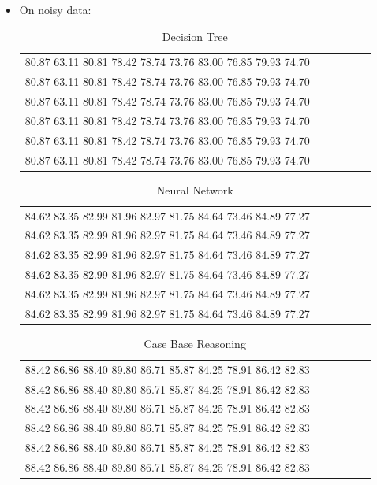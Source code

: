 \documentclass[a4paper,12pt,oneside,final]{report}
\begin{document}
\begin{enumerate}
\begin{itemize}
\item On noisy data:

\begin{table} [H]
\begin{center}
\begin{tabular}{llllll}
80.87 63.11 80.81 78.42 78.74 73.76 83.00 76.85 79.93 74.70 \\
80.87 63.11 80.81 78.42 78.74 73.76 83.00 76.85 79.93 74.70 \\
80.87 63.11 80.81 78.42 78.74 73.76 83.00 76.85 79.93 74.70 \\
80.87 63.11 80.81 78.42 78.74 73.76 83.00 76.85 79.93 74.70 \\
80.87 63.11 80.81 78.42 78.74 73.76 83.00 76.85 79.93 74.70 \\
80.87 63.11 80.81 78.42 78.74 73.76 83.00 76.85 79.93 74.70 \\
\end{tabular}
\caption{ Decision Tree  }
\end{center}
\end{table}


\begin{table} [H]
\begin{center}
\begin{tabular}{llllll}
84.62 83.35 82.99 81.96 82.97 81.75 84.64 73.46 84.89 77.27 \\
84.62 83.35 82.99 81.96 82.97 81.75 84.64 73.46 84.89 77.27 \\
84.62 83.35 82.99 81.96 82.97 81.75 84.64 73.46 84.89 77.27 \\
84.62 83.35 82.99 81.96 82.97 81.75 84.64 73.46 84.89 77.27 \\
84.62 83.35 82.99 81.96 82.97 81.75 84.64 73.46 84.89 77.27 \\
84.62 83.35 82.99 81.96 82.97 81.75 84.64 73.46 84.89 77.27 \\
\end{tabular}
\caption{ Neural Network}
\end{center}
\end{table}

\begin{table} [H]
\begin{center}
\begin{tabular}{llllll}
88.42  86.86  88.40  89.80  86.71  85.87  84.25  78.91  86.42  82.83 \\
88.42  86.86  88.40  89.80  86.71  85.87  84.25  78.91  86.42  82.83 \\
88.42  86.86  88.40  89.80  86.71  85.87  84.25  78.91  86.42  82.83 \\
88.42  86.86  88.40  89.80  86.71  85.87  84.25  78.91  86.42  82.83 \\
88.42  86.86  88.40  89.80  86.71  85.87  84.25  78.91  86.42  82.83 \\
88.42  86.86  88.40  89.80  86.71  85.87  84.25  78.91  86.42  82.83 \\
\end{tabular}
\caption{ Case Base Reasoning}
\end{center}
\end{table}


\end{itemize}
\end{enumerate}
\end{document}
